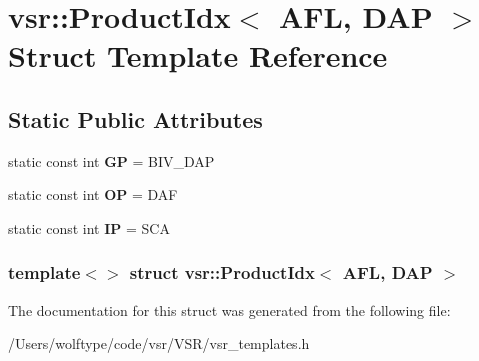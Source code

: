 \hypertarget{structvsr_1_1_product_idx_3_01_a_f_l_00_01_d_a_p_01_4}{\section{vsr\-:\-:Product\-Idx$<$ A\-F\-L, D\-A\-P $>$ Struct Template Reference}
\label{structvsr_1_1_product_idx_3_01_a_f_l_00_01_d_a_p_01_4}
}
\subsection*{Static Public Attributes}
\begin{DoxyCompactItemize}
\item 
\hypertarget{structvsr_1_1_product_idx_3_01_a_f_l_00_01_d_a_p_01_4_ac4f9224dc3f2de08bdd78affb779fb4c}{static const int {\bfseries G\-P} = B\-I\-V\-\_\-\-D\-A\-P}\label{structvsr_1_1_product_idx_3_01_a_f_l_00_01_d_a_p_01_4_ac4f9224dc3f2de08bdd78affb779fb4c}

\item 
\hypertarget{structvsr_1_1_product_idx_3_01_a_f_l_00_01_d_a_p_01_4_ab344ec1589c90e78e77e85e4029f7e78}{static const int {\bfseries O\-P} = D\-A\-F}\label{structvsr_1_1_product_idx_3_01_a_f_l_00_01_d_a_p_01_4_ab344ec1589c90e78e77e85e4029f7e78}

\item 
\hypertarget{structvsr_1_1_product_idx_3_01_a_f_l_00_01_d_a_p_01_4_aa0012e62f2084836c12905a78e08cb1d}{static const int {\bfseries I\-P} = S\-C\-A}\label{structvsr_1_1_product_idx_3_01_a_f_l_00_01_d_a_p_01_4_aa0012e62f2084836c12905a78e08cb1d}

\end{DoxyCompactItemize}
\subsubsection*{template$<$$>$ struct vsr\-::\-Product\-Idx$<$ A\-F\-L, D\-A\-P $>$}



The documentation for this struct was generated from the following file\-:\begin{DoxyCompactItemize}
\item 
/\-Users/wolftype/code/vsr/\-V\-S\-R/vsr\-\_\-templates.\-h\end{DoxyCompactItemize}
